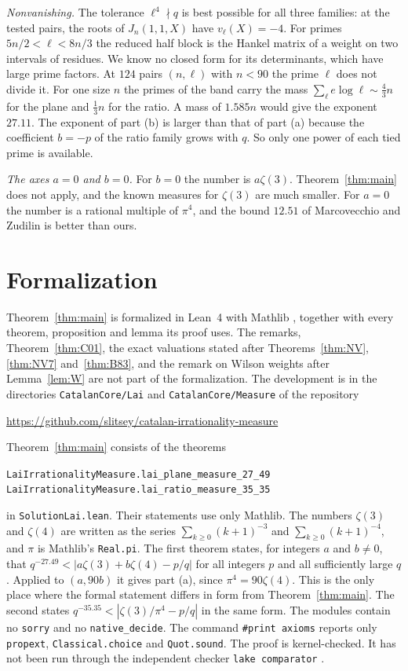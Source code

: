 \documentclass[11pt]{amsart}
\newcommand{\FormalizationURL}{https://github.com/slitsey/catalan-irrationality-measure}
\newcommand{\FormalizationLink}{\url{\FormalizationURL}}
\theoremstyle{definition}
\theoremstyle{remark}
\numberwithin{equation}{section}
\newcommand{\lean}[1]{\nolinkurl{#1}}
\begin{document}
\emph{Nonvanishing.} The tolerance $\ell^4\nmid q$ is best possible for all three families: at the tested pairs, the roots of
$J_n(1,1,X)$ have $v_\ell(X)=-4$. For primes $5n/2<\ell<8n/3$ the reduced half block is the Hankel matrix of a weight on two
intervals of residues. We know no closed form for its determinants, which have large prime factors. At $124$ pairs
$(n,\ell)$ with $n<90$ the prime $\ell$ does not divide it. For one size $n$ the primes of the band carry the mass
$\sum_\ell e\log\ell\sim\frac43n$ for the plane and $\frac13n$ for the ratio. A mass of $1.585n$ would give the
exponent $27.11$. The exponent of part (b) is larger than that of part (a) because the coefficient $b=-p$ of the
ratio family grows with $q$. So only one power of each tied prime is available.

\emph{The axes $a=0$ and $b=0$.} For $b=0$ the number is $a\zeta(3)$. Theorem~\ref{thm:main} does not apply, and the
known measures for $\zeta(3)$ are much smaller. For $a=0$ the number is a rational multiple of $\pi^4$, and the bound
$12.51$ of Marcovecchio and Zudilin is better than ours.

\section{Formalization}\label{sec:lean}
\raggedbottom

Theorem~\ref{thm:main} is formalized in Lean~4 \cite{Lean4} with Mathlib \cite{Mathlib}, together with every theorem,
proposition and lemma its proof uses. The remarks, Theorem~\ref{thm:C01}, the exact valuations stated after
Theorems~\ref{thm:NV}, \ref{thm:NV7} and~\ref{thm:B83}, and the remark on Wilson weights after Lemma~\ref{lem:W} are
not part of the formalization. The development is in the directories
\lean{CatalanCore/Lai} and \lean{CatalanCore/Measure} of the repository
\begin{center}
\FormalizationLink
\end{center}
Theorem~\ref{thm:main} consists of the theorems
\begin{center}
{\small\texttt{LaiIrrationalityMeasure.lai\_plane\_measure\_27\_49}}\\
{\small\texttt{LaiIrrationalityMeasure.lai\_ratio\_measure\_35\_35}}
\end{center}
in \lean{SolutionLai.lean}.
Their statements use only Mathlib. The numbers $\zeta(3)$ and $\zeta(4)$ are written as the
series $\sum_{k\ge0}(k+1)^{-3}$ and $\sum_{k\ge0}(k+1)^{-4}$, and $\pi$ is Mathlib's \lean{Real.pi}. The first theorem
states, for integers $a$ and $b\ne0$, that $q^{-27.49}<|a\zeta(3)+b\zeta(4)-p/q|$ for all integers $p$ and all
sufficiently large $q$. Applied to $(a,90b)$ it gives part (a), since $\pi^4=90\zeta(4)$. This is the only place
where the formal statement differs in form from Theorem~\ref{thm:main}. The second states $q^{-35.35}<|\zeta(3)/\pi^4-p/q|$ in the same form. The modules contain no
\lean{sorry} and no \lean{native_decide}. The command \lean{\#print axioms} reports only \lean{propext},
\lean{Classical.choice} and \lean{Quot.sound}. The proof is kernel-checked. It has not been run through the
independent checker \lean{lake comparator} \cite{Comparator}.
\end{document}
